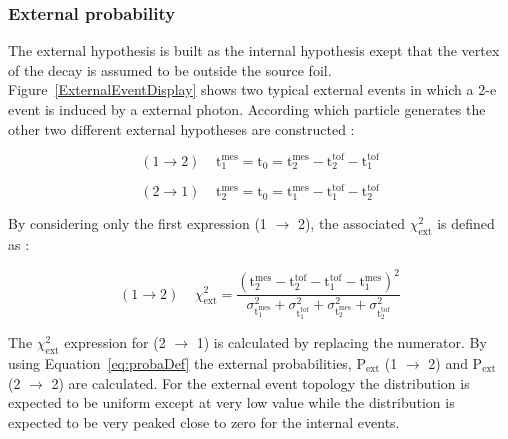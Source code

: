 \documentclass[main.tex]{subfiles}
\begin{document}
\FloatBarrier


\subsubsection{External probability}\label{sec:Pext}


\NI The external hypothesis is built as the internal hypothesis exept that the vertex of the decay is assumed to be outside the source foil. Figure~\ref{ExternalEventDisplay} shows two typical external events in which a 2-e event is induced by a external photon. According which particle generates the other two different external hypotheses are constructed : 


\begin{equation}
(\text{1} \rightarrow \text{2})~~~~~ \text{t}_\text{1}^{\text{mes}} = \text{t}_\text{0} = \text{t}_\text{2}^{\text{mes}} - \text{t}_\text{2}^{\text{tof}} - \text{t}_\text{1}^{\text{tof}}
\end{equation}

\begin{equation}
(\text{2} \rightarrow \text{1})~~~~~ \text{t}_\text{2}^{\text{mes}} = \text{t}_\text{0} = \text{t}_\text{1}^{\text{mes}} - \text{t}_\text{1}^{\text{tof}} - \text{t}_\text{2}^{\text{tof}}
\end{equation}


\NI By considering only the first expression (1 $\rightarrow$ 2), the associated $\chi^\text{2}_{\text{ext}}$ is defined as : 

\begin{equation}
(\text{1} \rightarrow \text{2})~~~~~ \chi^\text{2}_{\text{ext}} = \frac{ (\text{t}_\text{2}^{\text{mes}} - \text{t}_\text{2}^{\text{tof}} - \text{t}_\text{1}^{\text{tof}} - \text{t}_\text{1}^{\text{mes}} )^\text{2} }{  \sigma^{\text{2}}_{\text{t}_\text{1}^{\text{mes}}} + \sigma^{\text{2}}_{\text{t}_\text{1}^{\text{tof}}} + \sigma^{\text{2}}_{\text{t}_\text{2}^{\text{mes}}} + \sigma^{\text{2}}_{\text{t}_\text{2}^{\text{tof}}} }
\end{equation}


\NI The $\chi^\text{2}_{\text{ext}}$ expression for (2 $\rightarrow$ 1) is calculated by replacing the numerator. By using Equation~\ref{eq:probaDef} the external probabilities, P$_{\text{ext}}$ (1 $\rightarrow$ 2) and P$_{\text{ext}}$ (2 $\rightarrow$ 2) are calculated. For the external event topology the distribution is expected to be uniform except at very low value while the distribution is expected to be very peaked close to zero for the internal events.
\end{document}
